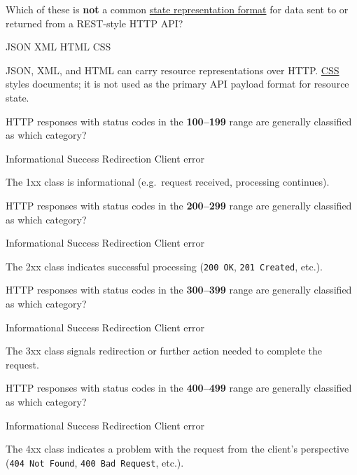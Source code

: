 \newpage

\question[4]
Which of these is \textbf{not} a common \uline{state representation format} for data sent to or returned from a REST-style HTTP API?
\begin{choices}
  \choice JSON
  \choice XML
  \choice HTML
  \CorrectChoice CSS
\end{choices}
\begin{solution}
  JSON, XML, and HTML can carry resource representations over HTTP. 
  \uline{CSS} styles documents; 
  it is not used as the primary API payload format for resource state.
\end{solution}

\question[4]
HTTP responses with status codes in the \textbf{100--199} range are generally classified as which category?
\begin{choices}
  \CorrectChoice Informational
  \choice Success
  \choice Redirection
  \choice Client error
\end{choices}
\begin{solution}
  The 1xx class is informational (e.g.\ request received, processing continues).
\end{solution}

\question[4]
HTTP responses with status codes in the \textbf{200--299} range are generally classified as which category?
\begin{choices}
  \choice Informational
  \CorrectChoice Success
  \choice Redirection
  \choice Client error
\end{choices}
\begin{solution}
  The 2xx class indicates successful processing (\texttt{200 OK}, \texttt{201 Created}, etc.).
\end{solution}


\question[4]
HTTP responses with status codes in the \textbf{300--399} range are generally classified as which category?
\begin{choices}
  \choice Informational
  \choice Success
  \CorrectChoice Redirection
  \choice Client error
\end{choices}
\begin{solution}
  The 3xx class signals redirection or further action needed to complete the request.
\end{solution}



\question[4]
HTTP responses with status codes in the \textbf{400--499} range are generally classified as which category?
\begin{choices}
  \choice Informational
  \choice Success
  \choice Redirection
  \CorrectChoice Client error
\end{choices}
\begin{solution}
  The 4xx class indicates a problem with the request from the client's perspective (\texttt{404 Not Found}, \texttt{400 Bad Request}, etc.).
\end{solution}


